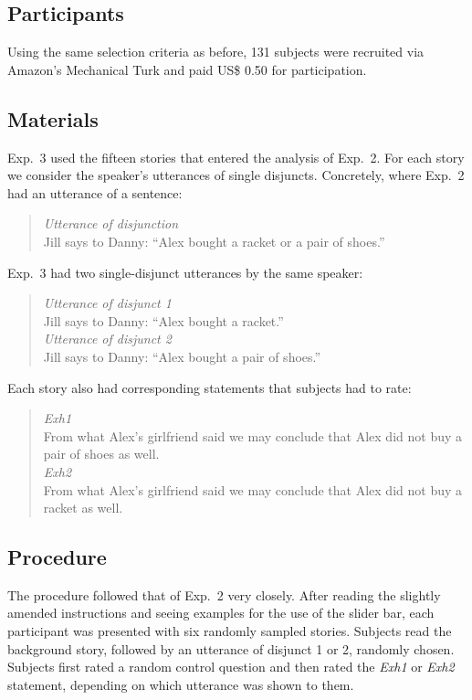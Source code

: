 \documentclass[12pt]{article}
\begin{document}
\subsection{Participants}

Using the same selection criteria as before, 131 subjects were recruited via Amazon's
Mechanical Turk and paid US\$ 0.50 for participation.

\subsection{Materials}

Exp.~3 used the fifteen stories that entered the analysis of Exp.~2. For each story we consider
the speaker's utterances of single disjuncts. Concretely, where Exp.~2 had an utterance of a
sentence:

\begin{quote}
  \emph{Utterance of disjunction}\\
  Jill says to Danny: ``Alex bought a racket or a pair of shoes.''
\end{quote}

\noindent Exp.~3 had two single-disjunct utterances by the same speaker:

\begin{quote}
  \emph{Utterance of disjunct 1}\\
  Jill says to Danny: ``Alex bought a racket.'' \\[.2cm]
  \emph{Utterance of disjunct 2}\\
  Jill says to Danny: ``Alex bought a pair of shoes.''
\end{quote}

\noindent Each story also had corresponding statements that subjects had to
rate:

\begin{quote}
  \emph{Exh1}\\
  From what Alex's girlfriend said we may conclude that Alex did not buy a pair of shoes as well. \\[.2cm]
  \emph{Exh2}\\
  From what Alex's girlfriend said we may conclude that Alex did not buy a racket as well.
\end{quote}

\subsection{Procedure}

The procedure followed that of Exp.~2 very closely. After reading the slightly amended
instructions and seeing examples for the use of the slider bar, each participant was presented
with six randomly sampled stories. Subjects read the background story, followed by an
utterance of disjunct 1 or 2, randomly chosen. Subjects first rated a random control question
and then rated the \emph{Exh1} or \emph{Exh2} statement, depending on which utterance was shown
to them.
\end{document}
